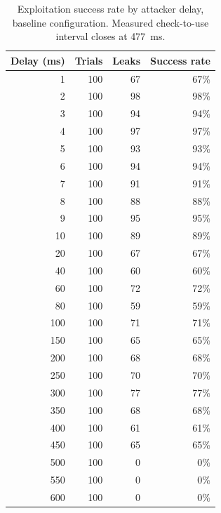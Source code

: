 \begin{table}[ht]
\centering
\begin{tabular}{rrrr}
\hline
Delay (ms) & Trials & Leaks & Success rate \\
\hline
1 & 100 & 67 & 67\% \\
2 & 100 & 98 & 98\% \\
3 & 100 & 94 & 94\% \\
4 & 100 & 97 & 97\% \\
5 & 100 & 93 & 93\% \\
6 & 100 & 94 & 94\% \\
7 & 100 & 91 & 91\% \\
8 & 100 & 88 & 88\% \\
9 & 100 & 95 & 95\% \\
10 & 100 & 89 & 89\% \\
20 & 100 & 67 & 67\% \\
40 & 100 & 60 & 60\% \\
60 & 100 & 72 & 72\% \\
80 & 100 & 59 & 59\% \\
100 & 100 & 71 & 71\% \\
150 & 100 & 65 & 65\% \\
200 & 100 & 68 & 68\% \\
250 & 100 & 70 & 70\% \\
300 & 100 & 77 & 77\% \\
350 & 100 & 68 & 68\% \\
400 & 100 & 61 & 61\% \\
450 & 100 & 65 & 65\% \\
500 & 100 & 0 & 0\% \\
550 & 100 & 0 & 0\% \\
600 & 100 & 0 & 0\% \\
\hline
\end{tabular}
\caption{Exploitation success rate by attacker delay, baseline configuration. Measured check-to-use interval closes at 477~ms.}
\label{tab:success-baseline}
\end{table}
